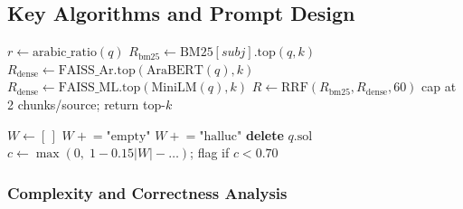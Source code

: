 \subsection{Key Algorithms and Prompt Design}
\label{subsec:prompts}

\noindent
\begin{minipage}[t]{0.48\textwidth}
\begin{algorithm}[H]
\small
\caption{HybridRetrieve$(q,\textit{subj},k{=}10)$}
\label{alg:rag}
\begin{algorithmic}[1]
\State $r \leftarrow \text{arabic\_ratio}(q)$
\State $R_{\text{bm25}} \leftarrow \text{BM25}[\textit{subj}].\text{top}(q,k)$
  \State $R_{\text{dense}} \leftarrow \text{FAISS\_Ar}.\text{top}(\text{AraBERT}(q),k)$
\Else
  \State $R_{\text{dense}} \leftarrow \text{FAISS\_ML}.\text{top}(\text{MiniLM}(q),k)$
\EndIf
\State $R \leftarrow \text{RRF}(R_{\text{bm25}},R_{\text{dense}},60)$
\State cap at 2 chunks/source; return top-$k$
\end{algorithmic}
\end{algorithm}
\end{minipage}
\hfill
\begin{minipage}[t]{0.48\textwidth}
\begin{algorithm}[H]
\small
\caption{GroundingValidate$(\textit{exam},\textit{md})$}
\label{alg:ground}
\begin{algorithmic}[1]
\State $W \leftarrow [\,]$
   $W \mathrel{+}= \text{"empty"}$ \EndIf
      \State $W \mathrel{+}= \text{"halluc"}$
    \EndIf
      \State \textbf{delete} $q.\text{sol}$
    \EndIf
  \EndFor
\EndFor
\State $c \leftarrow \max(0,\;1-0.15|W|-\ldots)$;\; flag if $c<0.70$
\end{algorithmic}
\end{algorithm}
\end{minipage}

\subsubsection{Complexity and Correctness Analysis}

